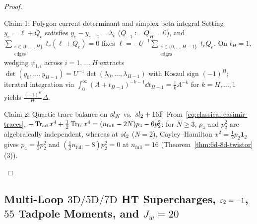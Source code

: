 \begin{proof}\leavevmode
\begin{proofpart}{Claim 1: Polygon current determinant and simplex beta integral}
Setting $y_e = \ell + Q_e$ satisfies $y_e - y_{e-1} = \lambda_e$ ($Q_{-1} := Q_H = 0$), and $\sum_{\substack{e\in\{0,\dots,H\}\\\mathrm{edges}}}t_e(\ell + Q_e) = 0$ fixes $\ell = -U^{-1}\sum_{\substack{e\in\{0,\dots,H-1\}\\\mathrm{edges}}}t_e Q_e$. On $t_H = 1$, wedging $\psi_{1,i}$ across $i=1,\dots,H$ extracts $\det(y_0,\dots,y_{H-1}) = U^{-1}\det(\lambda_0,\dots,\lambda_{H-1})$ with Koszul sign $(-1)^H$; iterated integration via $\int_0^\infty(A + t_{H-1})^{-k-1}\dd t_{H-1} = \frac{1}{k}A^{-k}$ for $k = H,\dots,1$ yields $\frac{(-1)^H}{H!}\Delta$.
\end{proofpart}
\begin{proofpart}{Claim 2: Quartic trace balance on $sl_N$ vs.\ $sl_2 + 16\mathrm{F}$}
From~\eqref{eq:classical-casimir-traces}, $-\operatorname{Tr}_{\mathrm{ad}}x^4 + \frac{1}{2}\operatorname{Tr}_U x^4 = (n_{\mathrm{full}}-2N)p_4 - 6p_2^2$: for $N \ge 3$, $p_4$ and $p_2^2$ are algebraically independent, whereas at $sl_2$ ($N=2$), Cayley--Hamilton $x^2 = \frac{1}{2}p_2\mathbf{1}_2$ gives $p_4 = \frac{1}{2}p_2^2$ and $(\frac{1}{2}n_{\mathrm{full}} - 8)p_2^2 = 0$ at $n_{\mathrm{full}} = 16$ (Theorem~\ref{thm:6d-8d-twistor}(3)).
\end{proofpart}
\end{proof}

\subsection{Multi-Loop \texorpdfstring{$3\mathrm{D}/5\mathrm{D}/7\mathrm{D}$}{3D/5D/7D} HT Supercharges, \texorpdfstring{$\varepsilon_2=-1$}{eps\_2=-1}, \texorpdfstring{$55$}{55} Tadpole Moments, and \texorpdfstring{$J_w=20$}{J\_w=20}}
\label{subsec:3d-ht-complete}

